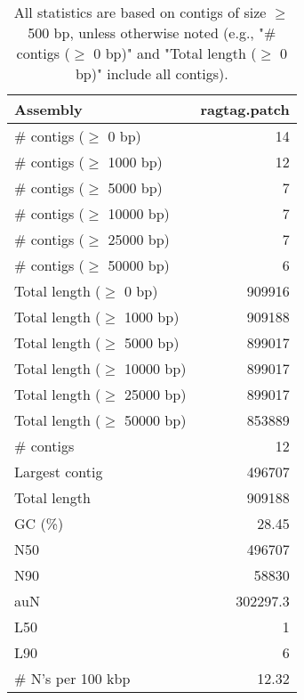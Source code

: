 \documentclass[12pt,a4paper]{article}
\begin{document}
\begin{table}[ht]
\begin{center}
\caption{All statistics are based on contigs of size $\geq$ 500 bp, unless otherwise noted (e.g., "\# contigs ($\geq$ 0 bp)" and "Total length ($\geq$ 0 bp)" include all contigs).}
\begin{tabular}{|l*{1}{|r}|}
\hline
Assembly & ragtag.patch \\ \hline
\# contigs ($\geq$ 0 bp) & 14 \\ \hline
\# contigs ($\geq$ 1000 bp) & 12 \\ \hline
\# contigs ($\geq$ 5000 bp) & 7 \\ \hline
\# contigs ($\geq$ 10000 bp) & 7 \\ \hline
\# contigs ($\geq$ 25000 bp) & 7 \\ \hline
\# contigs ($\geq$ 50000 bp) & 6 \\ \hline
Total length ($\geq$ 0 bp) & 909916 \\ \hline
Total length ($\geq$ 1000 bp) & 909188 \\ \hline
Total length ($\geq$ 5000 bp) & 899017 \\ \hline
Total length ($\geq$ 10000 bp) & 899017 \\ \hline
Total length ($\geq$ 25000 bp) & 899017 \\ \hline
Total length ($\geq$ 50000 bp) & 853889 \\ \hline
\# contigs & 12 \\ \hline
Largest contig & 496707 \\ \hline
Total length & 909188 \\ \hline
GC (\%) & 28.45 \\ \hline
N50 & 496707 \\ \hline
N90 & 58830 \\ \hline
auN & 302297.3 \\ \hline
L50 & 1 \\ \hline
L90 & 6 \\ \hline
\# N's per 100 kbp & 12.32 \\ \hline
\end{tabular}
\end{center}
\end{table}
\end{document}
